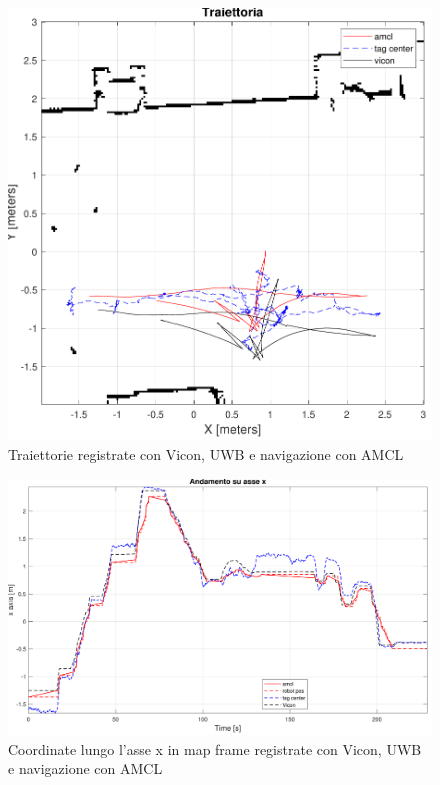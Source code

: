 \begin{figure}[h] 
	\centering    
	\includegraphics[height=.4\textheight]{grafici_stanzavolo_vicon/figure1.pdf}
	\caption{Traiettorie registrate con Vicon, UWB e navigazione con AMCL}
	\label{fig: traiettorie_vicon_charlie}
\end{figure}

\begin{figure}[h] 
	\centering    
	\includegraphics[height=.3\textheight]{grafici_stanzavolo_vicon/figure5.pdf}
	\caption{Coordinate lungo l'asse x in map frame registrate con Vicon, UWB e navigazione con AMCL}
	\label{fig: asse_x_vicon_charlie}
\end{figure}

